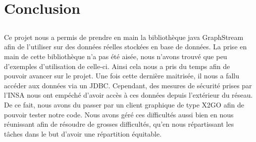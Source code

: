 \chapter{Conclusion}
\section*{}
Ce projet nous a permis de prendre en main la bibliothèque java GraphStream afin de l'utiliser sur des données réelles stockées en base de données.
La prise en main de cette bibliothèque n'a pas été aisée, nous n'avons trouvé que peu d'exemples d'utilisation de celle-ci. Ainsi cela nous a pris du temps afin de pouvoir avancer sur le projet.
Une fois cette dernière maitrisée, il nous a fallu accéder aux données via un JDBC. Cependant, des mesures de sécurité prises par l'INSA nous ont empéché d'avoir accès à ces données depuis l'extérieur du réseau.
De ce fait, nous avons du passer par un client graphique de type X2GO afin de pouvoir tester notre code.
Nous avons géré ces difficultés aussi bien en nous réunissant afin de résoudre de grosses difficultés, qu'en nous répartissant les tâches dans le but d'avoir une répartition équitable.
\section*{}
